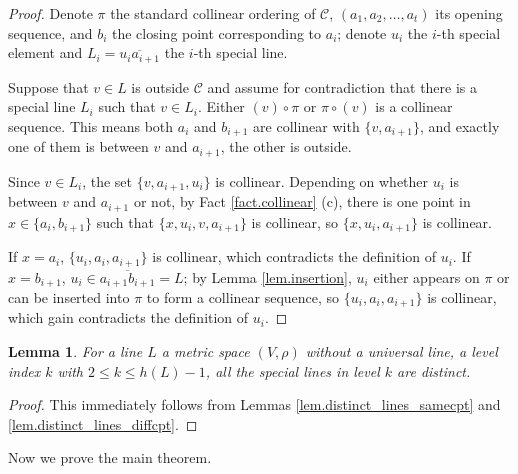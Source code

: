 \documentclass[12pt]{article}
\newcommand{\ov}{\overline}
\newtheorem{lem}{Lemma}
\begin{document}
\begin{proof}
Denote $\pi$ the standard collinear ordering of $\mathcal{C}$,
$(a_1, a_2, \dots, a_t)$ its opening sequence,
and $b_i$ the closing point corresponding to $a_i$;
denote $u_i$ the $i$-th special element and $L_i = \ov{u_i a_{i+1}}$
the $i$-th special line.

Suppose that $v\in L$ is outside $\mathcal{C}$ and assume for contradiction that there is a special line $L_i$ such that $v\in L_i$. Either $(v) \circ \pi$ or $\pi \circ (v)$ is a collinear sequence.
This means both $a_i$ and $b_{i+1}$ are collinear with $\{v, a_{i+1}\}$,
and exactly one of them is between $v$ and $a_{i+1}$, the other is outside.

Since $v \in L_i$, the set $\{v, a_{i+1}, u_i\}$ is collinear.
Depending on whether $u_i$ is between $v$ and  $a_{i+1}$ or not,
by Fact \ref{fact.collinear} (c),
there is one point in $x \in \{a_i, b_{i+1}\}$ such that 
$\{x, u_i, v, a_{i+1}\}$ is collinear, so $\{x, u_i, a_{i+1}\}$ is collinear.

If $x = a_i$, $\{u_i, a_i, a_{i+1}\}$ is collinear, which contradicts the definition of $u_i$.
If $x = b_{i+1}$, $u_i \in \ov{a_{i+1} b_{i+1}} = L$;
by Lemma \ref{lem.insertion}, $u_i$ either appears on $\pi$ 
or can be inserted into $\pi$ to form a collinear sequence,
so $\{u_i, a_i, a_{i+1}\}$ is collinear, which gain contradicts the definition of $u_i$.
\end{proof}

\begin{lem}\label{lem.distinct_lines}
For a line $L$ a metric space $(V, \rho)$ without a universal line,
a level index $k$ with $2 \le k \le h(L)-1$, all the special lines in level $k$
are distinct. 
\end{lem}

\begin{proof}
This immediately follows from Lemmas \ref{lem.distinct_lines_samecpt} and \ref{lem.distinct_lines_diffcpt}.
\end{proof}

Now we prove the main theorem.
\end{document}
